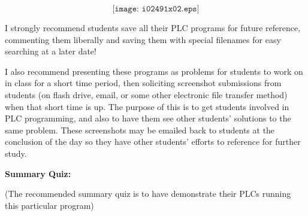 $$\texttt{[image: i02491x02.eps]}$$

\vskip 10pt




I strongly recommend students save all their PLC programs for future reference, commenting them liberally and saving them with special filenames for easy searching at a later date!

\vskip 10pt

I also recommend presenting these programs as problems for students to work on in class for a short time period, then soliciting screenshot submissions from students (on flash drive, email, or some other electronic file transfer method) when that short time is up.  The purpose of this is to get students involved in PLC programming, and also to have them see other students' solutions to the same problem.  These screenshots may be emailed back to students at the conclusion of the day so they have other students' efforts to reference for further study.

\vfil \eject

\noindent
{\bf Summary Quiz:}

(The recommended summary quiz is to have  demonstrate their PLCs running this particular program)




